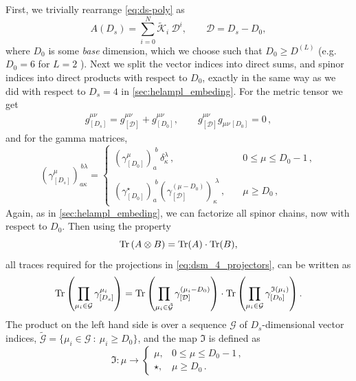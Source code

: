 First, we trivially rearrange \cref{eq:ds-poly} as
\begin{equation} \label{eq:ds-poly-alt}
  A(D_s) = \sum_{i=0}^{N} \tilde{\mathcal{K}}_i~\mathcal{D}^{i}, \qquad \mathcal{D} = D_s - D_0,
\end{equation}
where $D_0$ is some \textit{base} dimension, which we choose such that $ D_0 \geq D^{(L)} $ (e.g.\ $D_0=6$ for $L=2$ ).
Next we split the vector indices into direct sums, and spinor indices into direct products
with respect to $D_0$, exactly in the same way as we did with respect to $D_s=4$ in \cref{sec:helampl_embeding}.
For the metric tensor we get
\begin{align} \label{eq:ds-split-metric}
  g^{\mu\nu}_{[D_s]}  = g^{\mu\nu}_{[\mathcal{D}]} + g^{\mu\nu}_{[D_0]},  \qquad
  g^{\mu\nu}_{[\mathcal{D}]}g^{\phantom{\mu\nu}}_{\mu\nu\,[D_0]} = 0\,,
\end{align}
and for the gamma matrices,
\begin{equation} \label{eq:ds-gamma}
  (\gamma_{[D_s]}^\mu)_{a\kappa}^{\,b\lambda}  = \left\{ 
    \begin{array}{ll} 
      \left(\gamma_{[D_0]}^\mu\right)_a^{\;b} \,
      \delta_\kappa^\lambda\,, &\quad  0\le\mu \le D_0-1 \,,\\&\\
      \left(\gamma^\star_{[D_0]}\right)_a^{\;b} 
      \left(\gamma_{[\mathcal{D}]}^{(\mu-D_0)}\right)_\kappa^{\;\lambda}\,, 
      &\quad \mu \geq D_0 \,,
    \end{array}
    \right.
\end{equation}
Again, as in \cref{sec:helampl_embeding}, 
we can factorize all spinor chains, now with respect to $D_0$.
Then using the property
\[
  \Tr\qty(A \otimes B) = \Tr(A) \cdot \Tr(B),
\]
all traces required for the projections in \eqref{eq:dsm_4_projectors},
can be written as
\begin{equation} \label{eq:ds-split-traces}
  \Tr\left(\prod_{\mu_i\in \mathcal{G}}\gamma^{\mu_i}_{[D_s]}\right) =
  \Tr\left(\prod_{\mu_i\in \tilde{\mathcal{G}}}\gamma^{(\mu_i-D_0)}_{[\mathcal{D}]}\right) \cdot
  \Tr\left(\prod_{\mu_i\in \mathcal{G}}\gamma^{\mathfrak{I}(\mu_i)}_{[D_0]}\right).
\end{equation}
The product on the left hand side is over a sequence $\mathcal{G}$ of $D_s$-dimensional vector indices,
$\tilde{\mathcal{G}} = \{ \mu_i \in \mathcal{G} ~:~ \mu_i \geq D_0 \}$, and the map $\mathfrak{I}$ is defined as
\begin{equation}
  \mathfrak{I} : \mu \to
    \begin{cases}
      \mu, & 0\le\mu \le D_0-1\,, \\
      \star, & \mu \geq D_0\,.
    \end{cases}
\end{equation}
